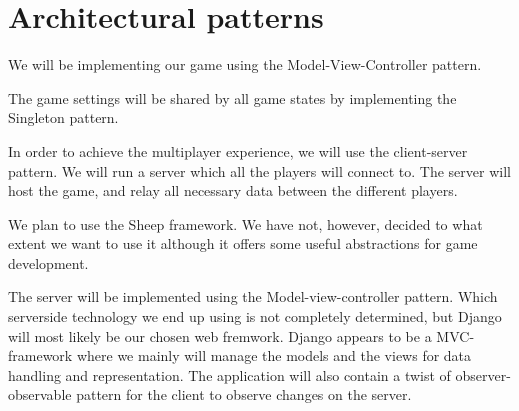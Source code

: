 \section{Architectural patterns}
\label{architecturalpatterns}

We will be implementing our game using the Model-View-Controller pattern.

The game settings will be shared by all game states by implementing the
Singleton pattern.

In order to achieve the multiplayer experience, we will use the client-server
pattern. We will run a server which all the players will connect to. The server
will host the game, and relay all necessary data between the different players.

We plan to use the Sheep framework. We have not, however, decided to what
extent we want to use it although it offers some useful abstractions for game
development.

The server will be implemented using the Model-view-controller pattern. Which
serverside technology we end up using is not completely determined, but Django
will most likely be our chosen web fremwork. Django appears to be a
MVC-framework where we mainly will manage the models and the views for data
handling and representation. The application will also contain a twist of
observer-observable pattern for the client to observe changes on the server.
